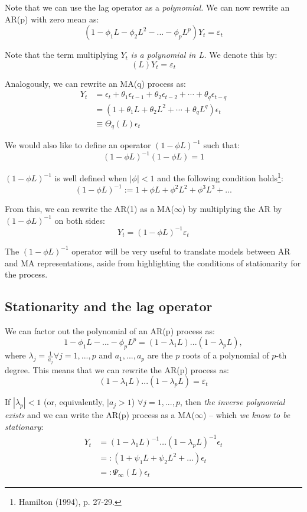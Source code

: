 \documentclass[11pt, a4paper]{report}
\theoremstyle{plain}
\theoremstyle{plain}
\theoremstyle{remark}
\begin{document}
Note that we can use the lag operator as a \textit{polynomial.} We can now rewrite an AR(p) with zero mean as:
$$ (1 - \phi_1 L - \phi_2 L^2 - ... - \phi_p L^p)Y_t = \varepsilon_{t} $$

Note that the term multiplying $Y_t$ \textit{is a polynomial in L.} We denote this by:
$$ (L) Y_t = \varepsilon_{t} $$

Analogously, we can rewrite an MA(q) process as:
$$\begin{aligned}
	Y_{t} &=\epsilon_{t}+\theta_{1} \epsilon_{t-1}+\theta_{2} \epsilon_{t-2}+\cdots+\theta_{q} \epsilon_{t-q} \\
	&=\left(1+\theta_{1} L+\theta_{2} L^{2}+\cdots+\theta_{q} L^{q}\right) \epsilon_{t} \\
	& \equiv \Theta_{q}(L) \epsilon_{t}
\end{aligned}$$

We would also like to define an operator $(1 - \phi L)^{-1}$ such that:
$$ (1 - \phi L)^{-1} (1 - \phi L) = 1 $$

$(1 - \phi L)^{-1}$ is well defined when $|\phi| < 1$ and the following condition holds\footnote{Hamilton (1994), p. 27-29.}:
$$ (1 - \phi L)^{-1} := 1 + \phi L + \phi^2 L^2 + \phi^3 L^3 + ... $$

From this, we can rewrite the AR(1) as a MA($\infty$) by multiplying the AR by $(1 - \phi L)^{-1}$ on both sides:
$$ Y_t = (1 - \phi L)^{-1} \varepsilon_{t}$$

The $(1 - \phi L)^{-1}$ operator will be very useful to translate models between AR and MA representations, aside from highlighting the conditions of stationarity for the process.


\subsection{Stationarity and the lag operator}

We can factor out the polynomial of an AR(p) process as:
$$ 1 - \phi_1 L - ... - \phi_{p} L^p = (1 - \lambda_1 L)...(1 - \lambda_p L), $$
where $\lambda_j = \frac{1}{a_j} \forall j = 1,..., p$ and $a_1, ..., a_p$ are the $p$ roots of a polynomial of $p$-th degree. This means that we can rewrite the AR(p) process as:
$$ (1 - \lambda_1 L)...(1 - \lambda_p L) = \varepsilon_{t} $$

If $|\lambda_p | < 1$ (or, equivalently, $|a_j > 1$) $\forall j = 1, ..., p$, then \textit{the inverse polynomial exists} and we can write the AR(p) process as a MA($\infty$) -- which \textit{we know to be stationary}:
$$\begin{aligned}
	Y_{t} &=\left(1-\lambda_{1} L\right)^{-1} \ldots\left(1-\lambda_{p} L\right)^{-1} \epsilon_{t} \\
	&=:\left(1+\psi_{1} L+\psi_{2} L^{2}+\ldots\right) \epsilon_{t} \\
	&=: \Psi_{\infty}(L) \epsilon_{t}
\end{aligned}$$
\end{document}
